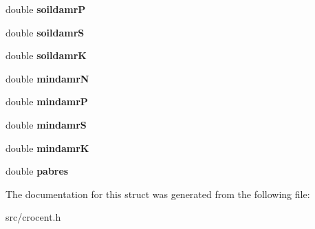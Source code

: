 \begin{DoxyCompactItemize}
\item 
\hypertarget{struct_bio_cro_to_cropcent_parms_a3c9619801260f6b2e074fbf1aeaf3eac}{double {\bfseries soildamr\-P}}\label{struct_bio_cro_to_cropcent_parms_a3c9619801260f6b2e074fbf1aeaf3eac}

\item 
\hypertarget{struct_bio_cro_to_cropcent_parms_a77aa2a217e2ffe8e91b81d3ed9b9eef1}{double {\bfseries soildamr\-S}}\label{struct_bio_cro_to_cropcent_parms_a77aa2a217e2ffe8e91b81d3ed9b9eef1}

\item 
\hypertarget{struct_bio_cro_to_cropcent_parms_a692441e9c254e9119f92548b8145e2f4}{double {\bfseries soildamr\-K}}\label{struct_bio_cro_to_cropcent_parms_a692441e9c254e9119f92548b8145e2f4}

\item 
\hypertarget{struct_bio_cro_to_cropcent_parms_a84799e8e86f220a14d22c8593dae2d05}{double {\bfseries mindamr\-N}}\label{struct_bio_cro_to_cropcent_parms_a84799e8e86f220a14d22c8593dae2d05}

\item 
\hypertarget{struct_bio_cro_to_cropcent_parms_a344edc806822fb781012bc61cfe50b81}{double {\bfseries mindamr\-P}}\label{struct_bio_cro_to_cropcent_parms_a344edc806822fb781012bc61cfe50b81}

\item 
\hypertarget{struct_bio_cro_to_cropcent_parms_a9e2e6ec006e70881c644178479ae8d3f}{double {\bfseries mindamr\-S}}\label{struct_bio_cro_to_cropcent_parms_a9e2e6ec006e70881c644178479ae8d3f}

\item 
\hypertarget{struct_bio_cro_to_cropcent_parms_a31bad6f853b332f651b088549c2d3613}{double {\bfseries mindamr\-K}}\label{struct_bio_cro_to_cropcent_parms_a31bad6f853b332f651b088549c2d3613}

\item 
\hypertarget{struct_bio_cro_to_cropcent_parms_a157c0a0a64ef900ec745b9b74e20389f}{double {\bfseries pabres}}\label{struct_bio_cro_to_cropcent_parms_a157c0a0a64ef900ec745b9b74e20389f}

\end{DoxyCompactItemize}


The documentation for this struct was generated from the following file\-:\begin{DoxyCompactItemize}
\item 
src/crocent.\-h\end{DoxyCompactItemize}
